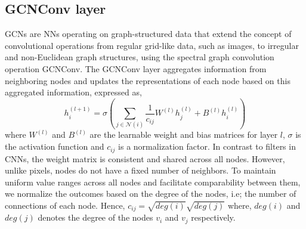 \subsection{GCNConv layer}
GCNs are NNs operating on graph-structured data that extend the concept of convolutional operations from regular grid-like data, such as images, to irregular and non-Euclidean graph structures, using the spectral graph convolution operation GCNConv. The GCNConv layer aggregates information from neighboring nodes and updates the representations of each node based on this aggregated information, expressed as,
\begin{equation}
h_i^{(l+1)} = \sigma \left(\sum_{j \in \mathcal{N}(i)} \frac{1}{c_{ij}} W^{(l)} h_j^{(l)} + B^{(l)} h_i^{(l)} \right)
\end{equation}
where $W^{(l)}$ and $B^{(l)}$ are the learnable weight and bias matrices for layer $l$, $\sigma$ is the activation function and $c_{ij}$ is a normalization factor. 
In contrast to filters in CNNs, the weight matrix is consistent and shared across all nodes. However, unlike pixels, nodes do not have a fixed number of neighbors. To maintain uniform value ranges across all nodes and facilitate comparability between them, we normalize the outcomes based on the degree of the nodes, i.e; the number of connections of each node. Hence, $c_{ij} = \sqrt{deg(i)}\sqrt{deg(j)}$ where, ${deg(i)}$ and ${deg(j)}$ denotes the degree of the nodes $v_i$ and $v_j$ respectively. 

